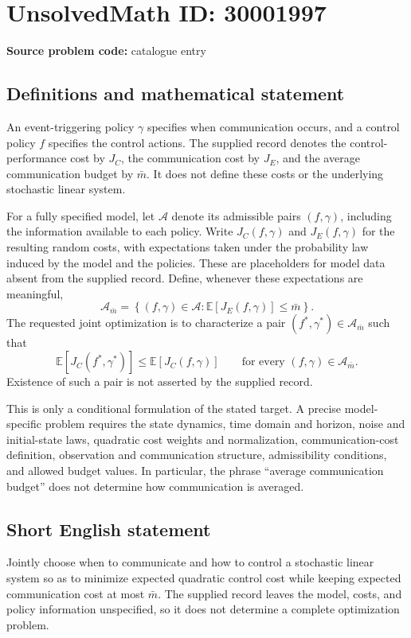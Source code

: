 \documentclass[11pt]{article}
\begin{document}
\section*{UnsolvedMath ID: 30001997}
\textbf{Source problem code:} catalogue entry
\subsection{Definitions and mathematical statement}
An event-triggering policy \(\gamma\) specifies when communication occurs, and a control policy \(f\) specifies the control actions. The supplied record denotes the control-performance cost by \(J_C\), the communication cost by \(J_E\), and the average communication budget by \(\bar m\). It does not define these costs or the underlying stochastic linear system.

For a fully specified model, let \(\mathcal A\) denote its admissible pairs \((f,\gamma)\), including the information available to each policy. Write \(J_C(f,\gamma)\) and \(J_E(f,\gamma)\) for the resulting random costs, with expectations taken under the probability law induced by the model and the policies. These are placeholders for model data absent from the supplied record. Define, whenever these expectations are meaningful,
\[
\mathcal A_{\bar m}
=\left\{(f,\gamma)\in\mathcal A:
\mathbb E[J_E(f,\gamma)]\leq\bar m\right\}.
\]
The requested joint optimization is to characterize a pair \((f^*,\gamma^*)\in\mathcal A_{\bar m}\) such that
\[
\mathbb E[J_C(f^*,\gamma^*)]
\leq \mathbb E[J_C(f,\gamma)]
\qquad\text{for every }(f,\gamma)\in\mathcal A_{\bar m}.
\]
Existence of such a pair is not asserted by the supplied record.

This is only a conditional formulation of the stated target. A precise model-specific problem requires the state dynamics, time domain and horizon, noise and initial-state laws, quadratic cost weights and normalization, communication-cost definition, observation and communication structure, admissibility conditions, and allowed budget values. In particular, the phrase ``average communication budget'' does not determine how communication is averaged.
\subsection{Short English statement}
Jointly choose when to communicate and how to control a stochastic linear system so as to minimize expected quadratic control cost while keeping expected communication cost at most \(\bar m\). The supplied record leaves the model, costs, and policy information unspecified, so it does not determine a complete optimization problem.
\end{document}
